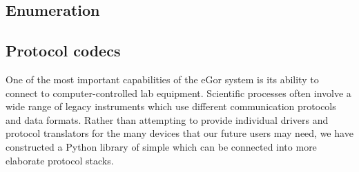 \documentclass[../thesis]{subfiles}
\begin{document}
\subsection{Enumeration}


\subsection{Protocol codecs}
One of the most important capabilities of the eGor system is its
ability to connect to computer-controlled lab equipment. Scientific
processes often involve a wide range of legacy instruments which use
different communication protocols and data formats. Rather than
attempting to provide individual drivers and protocol translators for
the many devices that our future users may need, we have constructed a
Python library of simple   which can be connected into more elaborate
protocol stacks.
\end{document}
